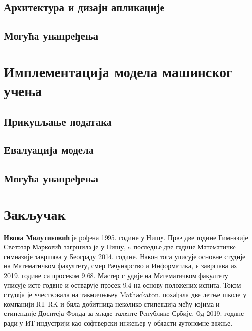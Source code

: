 \documentclass[12pt,oneside]{memoir}
\begin{document}
\section{Архитектура и дизајн апликације}
\section{Могућа унапређења}

\chapter{Имплементација модела машинског учења}
\section{Прикупљање података}
\section{Евалуација модела}
\section{Могућа унапређења}



\chapter{Закључак}


\literatura


\backmatter

\begin{biografija}
\textbf{Ивона Милутиновић} је рођена 1995. године у Нишу. 
Прве две године Гимназије Светозар Марковић завршила је у Нишу, a последње две године Математичке гимназије завршава у Београду 2014. године. 
Након тога уписује основне студије на Математичком факултету, смер Рачунарство и Информатика, и завршава их 2019. године са просеком 9.68. Мастер студије на Математичком факултету уписује исте године и остварује просек 9.4 на основу положених испита. Током студија је учествовала на такмичњњеу Mathаckaton, похађала две летње школе у компанији RT-RK и била добитница неколико стипендија међу којима и стипендије Доситеја Фонда за младе таленте Републике Србије.
Од 2019. године ради у ИТ индустрији као софтверски инжењер у области аутономне вожње.
\end{biografija}
\end{document}
